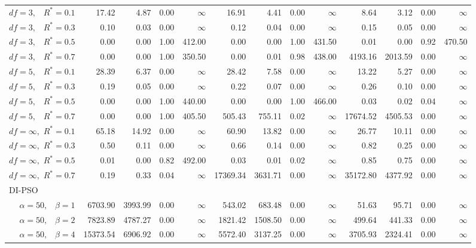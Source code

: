 \documentclass[12pt]{article}
\begin{document}
\begin{table}[ht]
{\begin{tabular}{r|rrrr|rrrr|rrrr}
  $df = 3,\enspace$ $R^* =0.1$ & 17.42 & 4.87 & 0.00 & $\infty$ & 16.91 & 4.41 & 0.00 & $\infty$ & 8.64 & 3.12 & 0.00 & $\infty$ \\ 
  $df = 3,\enspace$ $R^* =0.3$ & 0.10 & 0.03 & 0.00 & $\infty$ & 0.12 & 0.04 & 0.00 & $\infty$ & 0.15 & 0.05 & 0.00 & $\infty$ \\ 
  $df = 3,\enspace$ $R^* =0.5$ & 0.00 & 0.00 & 1.00 & 412.00 & 0.00 & 0.00 & 1.00 & 431.50 & 0.01 & 0.00 & 0.92 & 470.50 \\ 
  $df = 3,\enspace$ $R^* =0.7$ & 0.00 & 0.00 & 1.00 & 350.50 & 0.00 & 0.01 & 0.98 & 438.00 & 4193.16 & 2013.59 & 0.00 & $\infty$ \\ 
  $df = 5,\enspace$ $R^* =0.1$ & 28.39 & 6.37 & 0.00 & $\infty$ & 28.42 & 7.58 & 0.00 & $\infty$ & 13.22 & 5.27 & 0.00 & $\infty$ \\ 
  $df = 5,\enspace$ $R^* =0.3$ & 0.19 & 0.05 & 0.00 & $\infty$ & 0.22 & 0.07 & 0.00 & $\infty$ & 0.26 & 0.10 & 0.00 & $\infty$ \\ 
  $df = 5,\enspace$ $R^* =0.5$ & 0.00 & 0.00 & 1.00 & 440.00 & 0.00 & 0.00 & 1.00 & 466.00 & 0.03 & 0.02 & 0.04 & $\infty$ \\ 
  $df = 5,\enspace$ $R^* =0.7$ & 0.00 & 0.00 & 1.00 & 405.50 & 505.43 & 755.11 & 0.02 & $\infty$ & 17674.52 & 4505.53 & 0.00 & $\infty$ \\ 
  $df = \infty,$ $R^* =0.1$ & 65.18 & 14.92 & 0.00 & $\infty$ & 60.90 & 13.82 & 0.00 & $\infty$ & 26.77 & 10.11 & 0.00 & $\infty$ \\ 
  $df = \infty,$ $R^* =0.3$ & 0.50 & 0.11 & 0.00 & $\infty$ & 0.66 & 0.14 & 0.00 & $\infty$ & 0.82 & 0.25 & 0.00 & $\infty$ \\ 
  $df = \infty,$ $R^* =0.5$ & 0.01 & 0.00 & 0.82 & 492.00 & 0.03 & 0.01 & 0.02 & $\infty$ & 0.85 & 0.75 & 0.00 & $\infty$ \\ 
  $df = \infty,$ $R^* =0.7$ & 0.19 & 0.33 & 0.04 & $\infty$ & 17369.34 & 3631.71 & 0.00 & $\infty$ & 35172.80 & 4377.92 & 0.00 & $\infty$ \\ 
\hline
\multicolumn{1}{l|}{DI-PSO} &&&&&&&&&&&&\\
  $\alpha = 50,\enspace$ $\beta =1$ & 6703.90 & 3993.99 & 0.00 & $\infty$ & 543.02 & 683.48 & 0.00 & $\infty$ & 51.63 & 95.71 & 0.00 & $\infty$ \\ 
  $\alpha = 50,\enspace$ $\beta =2$ & 7823.89 & 4787.27 & 0.00 & $\infty$ & 1821.42 & 1508.50 & 0.00 & $\infty$ & 499.64 & 441.33 & 0.00 & $\infty$ \\ 
  $\alpha = 50,\enspace$ $\beta =4$ & 15373.54 & 6906.92 & 0.00 & $\infty$ & 5572.40 & 3137.25 & 0.00 & $\infty$ & 3705.93 & 2324.41 & 0.00 & $\infty$ \\ 

\end{tabular}}
\end{table}
\end{document}
